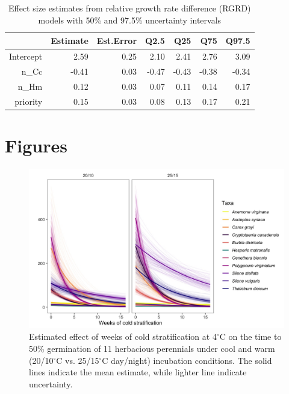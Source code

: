 \documentclass{article}
\begin{document}
\begin{table}[hp]
\centering
\begin{tabular}{rrrrrrr}
  \hline
 & Estimate & Est.Error & Q2.5 & Q25 & Q75 & Q97.5 \\ 
  \hline
Intercept & 2.59 & 0.25 & 2.10 & 2.41 & 2.76 & 3.09 \\ 
  n\_Cc & -0.41 & 0.03 & -0.47 & -0.43 & -0.38 & -0.34 \\ 
  n\_Hm & 0.12 & 0.03 & 0.07 & 0.11 & 0.14 & 0.17 \\ 
  priority & 0.15 & 0.03 & 0.08 & 0.13 & 0.17 & 0.21 \\ 
   \hline
\end{tabular}
\caption{Effect size estimates from relative growth rate difference (RGRD) models with 50\% and 97.5\% uncertainty intervals}
\label{tab:RGRD}
\end{table}

\pagebreak
\section*{Figures}
\begin{figure}[hp]
    \centering
\includegraphics[width=\textwidth]{..//figure/AFTall.jpeg}
   \caption{Estimated effect of weeks of cold stratification at 4$^\circ$C on the time to 50\% germination of 11 herbacious perennials under cool and warm (20/10$^\circ$C vs. 25/15$^\circ$C day/night) incubation conditions. The solid lines indicate the mean estimate, while lighter line indicate uncertainty.} 
   \label{fig:AFTall}
\end{figure}
\end{document}
